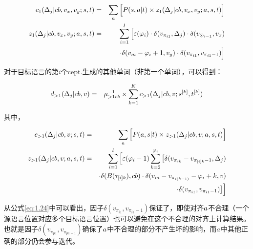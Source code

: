\begin{appendices}
\begin{eqnarray}
c_1(\Delta_j|cb,v_x,v_y;{s},{t})                   & = & \sum_{{a}}\Big[ {P}({s},{a}|{t}) \times z_1(\Delta_j|cb,v_x,v_y;{a},{s},{t}) \Big] \label{eq:1.24} \\
z_1(\Delta_j|cb,v_x,v_y;{a},{s},{t}) & = & \sum_{i=1}^l \Big [ \varepsilon(\varphi_i) \cdot \delta(v_{\pi_{i1}},\Delta_j) \cdot \delta(v_{\odot _{i-1}},v_x) \nonumber \\
                                                                                          &    & \cdot \delta(v_m-\varphi_i+1,v_y) \cdot \delta(v_{\pi_{i1}},v_{\pi_{i1}-1} )\Big] \label{eq:1.25}
\end{eqnarray}


对于目标语言的第$i$个cept.生成的其他单词（非第一个单词），可以得到：

\begin{eqnarray}
d_{>1}(\Delta_j|cb,v) &=& \mu_{>1cb}^{-1} \times \sum_{k=1}^{K}c_{>1}(\Delta_j|cb,v;{s}^{[k]},{t}^{[k]})
\label{eq:1.26}
\end{eqnarray}

其中，

\begin{eqnarray}
c_{>1}(\Delta_j|cb,v;{s},{t})                   & =  & \sum_{{a}}\Big[{P}({a},{s}|{t}) \times z_{>1}(\Delta_j|cb,v;{a},{s},{t}) \Big] \label{eq:1.27} \\
z_{>1}(\Delta_j|cb,v;{a},{s},{t}) & = & \sum_{i=1}^l\Big[\varepsilon(\varphi_i-1)\sum_{k=2}^{\varphi_i} \big[\delta(v_{\pi_{ik}}-v_{\pi_{[i]k}-1},\Delta_j)  \nonumber \\
                                                                                    &     & \cdot \delta(B(\tau_{[i]k}) ,cb) \cdot \delta(v_m-v_{\pi_{i(k-1)}}-\varphi_i+k,v) \nonumber \\
                                                                                    &     & \cdot \delta(v_{\pi_{i1}},v_{\pi_{i1}-1}) \big] \Big] \label{eq:1.28}
\end{eqnarray}

\vspace{0.5em}

\parinterval 从公式\eqref{eq:1.24}中可以看出，因子$\delta(v_{\pi_{i1}},v_{\pi_{i1}-1})$保证了，即使对齐${a}$不合理（一个源语言位置对应多个目标语言位置）也可以避免在这个不合理的对齐上计算结果。也就是因子$\delta(v_{\pi_{p1}},v_{\pi_{p1-1}})$确保了${a}$中不合理的部分不产生坏的影响，而${a}$中其他正确的部分仍会参与迭代。


\end{appendices}
